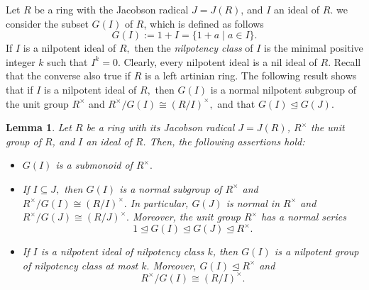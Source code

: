 \documentclass{amsart}
\newtheorem{lemma}[theorem]{Lemma}
\theoremstyle{definition}
\begin{document}
Let $R$ be a ring with the Jacobson radical $J=J(R)$, and $I$ an ideal of $R$. we consider the subset $G(I)$ of $R$, which is defined as follows
$$G(I):=1+I=\{1+a\mid a\in I\}.$$
If $I$ is a nilpotent ideal of $R,$ then the \textit{nilpotency class} of $I$ is the minimal positive integer $k$ such that $I^k=0$. Clearly, every nilpotent ideal is a nil ideal of $R$. Recall that the converse also true if $R$ is a left artinian ring. The following result shows that if $I$ is a nilpotent ideal of $R,$ then $G(I)$ is a normal nilpotent subgroup of the unit group $R^\times$ and $R^\times/G(I)\cong (R/I)^\times,$ and that $G(I)\trianglelefteq G(J).$

\begin{lemma}\label{lem:5.1} Let $R$ be a ring with its Jacobson radical $J=J(R)$, $R^\times$ the unit group of $R$, and $I$ an ideal of $R$. Then, the following assertions hold:
\begin{itemize}
\item [(1)] $G(I)$ is a submonoid of $R^\times.$
\item [(2)] If $I\subseteq J,$ then $G(I)$ is a normal subgroup of $R^\times$ and $R^\times/G(I)\cong (R/I)^\times.$ In particular, $G(J)$ is normal in $R^\times$ and $R^\times/G(J)\cong (R/J)^\times.$ Moreover, the unit group $R^\times$ has a normal series $$1\trianglelefteq G(I)\trianglelefteq G(J)\trianglelefteq R^\times.$$
\item [(3)] If $I$ is a nilpotent ideal of nilpotency class $k$, then $G(I)$ is a nilpotent group of nilpotency class at most $k.$ Moreover, $G(I)\trianglelefteq R^\times$ and $$R^\times/G(I)\cong (R/I)^\times.$$
\end{itemize}	
\end{lemma} 
\end{document}
